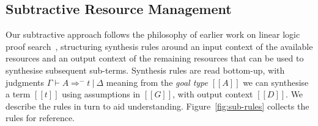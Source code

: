 \subsection{Subtractive Resource Management}
\label{subsec:subtractive}
  Our subtractive approach follows the philosophy of earlier work on
  linear logic proof search~\citep{HODAS1994327,CERVESATO2000133},
  structuring synthesis rules around an input context of the available
  resources and an output context of the remaining resources that
  can be used to synthesise subsequent sub-terms. Synthesis rules
  are read bottom-up, with judgments $\Gamma \vdash A \Rightarrow^{-} t\ |\ \Delta$
  meaning from the \emph{goal type} $[[A]]$ we can synthesise a term $[[t]]$ using
  assumptions in $[[G]]$, with output context $[[D]]$. We describe
  the rules in turn to aid understanding. Figure~\ref{fig:sub-rules} collects the
  rules for reference.
